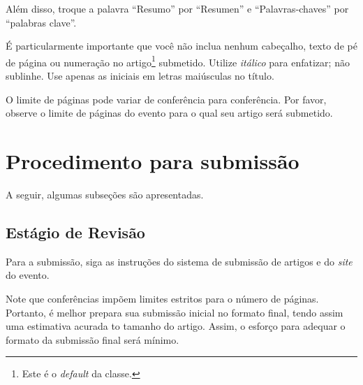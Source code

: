 Além disso, troque a palavra ``Resumo'' por ``Resumen'' e  ``Palavras-chaves'' por ``palabras clave''.


É particularmente importante 
que você não inclua nenhum cabeçalho, texto de pé de página ou numeração 
no artigo\footnote{Este é o {\em default} da classe.} submetido.
Utilize \emph{itálico} para enfatizar; não sublinhe. 
Use apenas as iniciais em letras maiúsculas no título. 


O limite de páginas pode variar de conferência para conferência. Por favor,
observe o limite de páginas do evento para o qual seu artigo será submetido.



\section{Procedimento para submissão}

A seguir, algumas subseções são apresentadas. 

\subsection{Estágio de Revisão}

Para a submissão, siga as instruções do sistema de submissão de artigos e do
{\em site} do evento. 


Note que conferências impõem limites estritos para o número de páginas.
Portanto, é melhor prepara sua submissão inicial no formato final, 
tendo assim uma estimativa acurada to tamanho do artigo. Assim, o
esforço para adequar o formato da submissão final será mínimo. 


